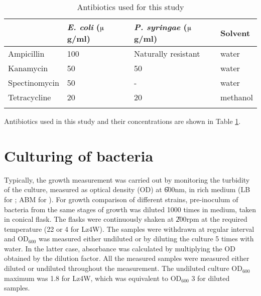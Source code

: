 \begin{table}[tbp]
\caption{Antibiotics used for this study} \label{antibiotics}
\centering
\begin{small}
\linespread{1.0}{\normalsize}
\renewcommand{\arraystretch}{1.3}
\begin{tabularx}{\linewidth}{@{}XXXX@{}}\toprule
   & \textbf{\emph{E. coli} ($\muup$g/ml)}& \textbf{\emph{P. syringae} ($\muup$g/ml)} &
   \textbf{Solvent} \\ \midrule \addlinespace
    Ampicillin      & 100 & Naturally resistant & water \\
    Kanamycin       & 50  &   50                & water  \\
    Spectinomycin   & 50  &   -                 & water  \\
    Tetracycline    & 20  &   20                & methanol \\
    \addlinespace
\bottomrule
 \end{tabularx}
\renewcommand{\arraystretch}{1.0}
\linespread{1.1}
\end{small}
\end{table}

Antibiotics used in this study and their concentrations are shown
in Table \ref{antibiotics}.

\section{Culturing of bacteria}
\label{chap2:culture} Typically, the growth measurement was
carried out by monitoring the turbidity of the culture, measured
as optical density (OD) at \U{600}{nm}, in rich medium (LB for
; ABM for ). For growth comparison of different
strains, pre-inoculum of bacteria from the same stages of growth
was diluted 1000 times in  medium, taken in 
conical flask. The flasks were continuously shaken at \U{200}{rpm}
at the required temperature (22\dg{} or 4\dg{} for Lz4W). The
samples were withdrawn at regular interval and OD$_{600}$ was
measured either undiluted or by diluting the culture 5 times with
water. In the latter case, absorbance was calculated by
multiplying the OD obtained by the dilution factor. All the
measured samples were measured either diluted or undiluted
throughout the measurement. The undiluted culture OD$_{600}$
maximum was 1.8 for Lz4W, which was equivalent to OD$_{600}$ 3 for
diluted samples.


